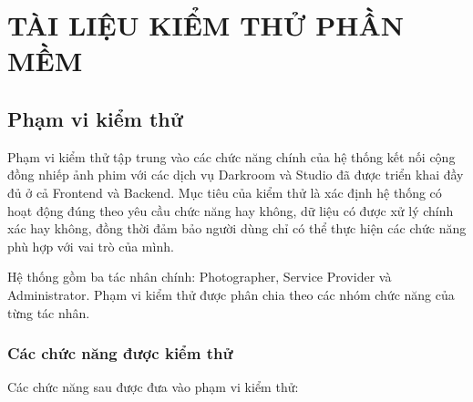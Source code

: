 \chapter{TÀI LIỆU KIỂM THỬ PHẦN MỀM}


\section{Phạm vi kiểm thử}

Phạm vi kiểm thử tập trung vào các chức năng chính của hệ thống kết nối cộng đồng nhiếp ảnh phim với các dịch vụ Darkroom và Studio đã được triển khai đầy đủ ở cả Frontend và Backend. Mục tiêu của kiểm thử là xác định hệ thống có hoạt động đúng theo yêu cầu chức năng hay không, dữ liệu có được xử lý chính xác hay không, đồng thời đảm bảo người dùng chỉ có thể thực hiện các chức năng phù hợp với vai trò của mình.

Hệ thống gồm ba tác nhân chính: Photographer, Service Provider và Administrator. Phạm vi kiểm thử được phân chia theo các nhóm chức năng của từng tác nhân.

\subsection{Các chức năng được kiểm thử}

Các chức năng sau được đưa vào phạm vi kiểm thử:

